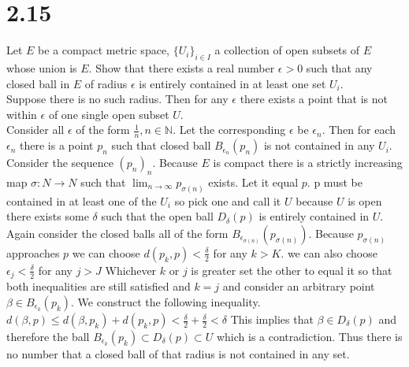 \documentclass{article}
\begin{document}
     \section{2.15}
     Let $E$ be a compact metric space, $\{U_i\}_{i\in I}$ a collection of open subsets of  $E$ whose union is $E$.
     Show that there exists a real number $\epsilon > 0$ such that any closed ball in $E$ of radius $\epsilon $ is entirely contained in at least one set $U_i$.
     \\
     Suppose there is no such radius.
     Then for any $\epsilon $ there exists a point that is not within $\epsilon $ of one single open subset $U$.\\
     Consider all $\epsilon $ of the form $\frac{1}{n}, n \in \mathbb{N} $. Let the corresponding $\epsilon $ be $\epsilon_n$. Then for each $\epsilon_n$ there is a point $p_n$ such that
     closed ball $B_{\epsilon_n}(p_n)$ is not contained in any $U_i$. \\
     Consider the sequence $(p_n)_n$. Because $E$ is compact there is a strictly increasing map $\sigma: N \rightarrow N$ such that $\lim_{n\to\infty} p_{\sigma (n)}$ exists.
     Let it equal $p$. p must be contained in at least one of the $U_i$ so pick one and call it $U$ because $U$ is open there exists some $\delta $ such that the open ball $D_{\delta }(p)$ is
     entirely contained in $U$. Again consider the closed balls all of the form $B_{\epsilon_{\sigma(n)}}(p_{\sigma (n)})$. Because $p_{\sigma (n)}$ approaches $p$ we can choose $d(p_k,p) < \frac{\delta}{2}$ for any $k > K$. 
 we can also choose $\epsilon_j < \frac{\delta}{2}$ for any $j > J$ Whichever  $k$ or $j$ is greater set the other to equal it so that both inequalities are still satisfied and $k=j$ and consider an arbitrary point  $\beta \in B_{\epsilon_k}(p_k)$.
 We construct the following inequality.\\
 $d(\beta, p) \le d(\beta,p_k) + d(p_k, p) < \frac{\delta}{2} + \frac{\delta}{2} < \delta $ This implies that $ \beta \in D_{\delta }(p)$ and therefore the ball $B_{\epsilon_k}(p_k) \subset D_{\delta }(p) \subset U$ which is a contradiction.
 Thus there is no number that a closed ball of that radius is not contained in any set.
     
\end{document}
